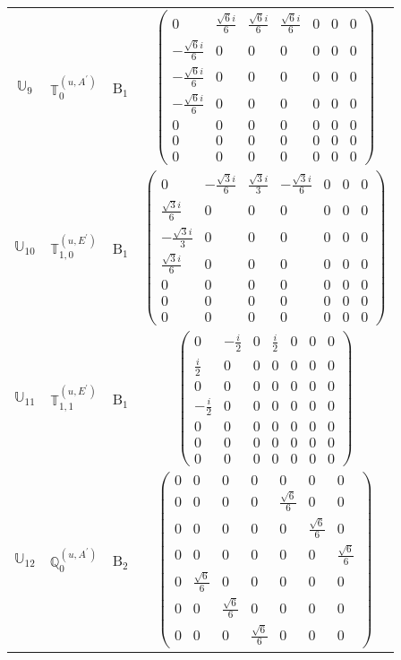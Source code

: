 \documentclass[fleqn,10pt,landscape]{article}
\begin{document}
\begin{itemize}
\begin{center}
\begin{longtable}{c|c|c|c}
$ \mathbb{U}_{9} $ & $\mathbb{T}_{0}^{(u,A^{\prime})}$ & B$_{1}$ & $\begin{pmatrix} 0 & \frac{\sqrt{6} i}{6} & \frac{\sqrt{6} i}{6} & \frac{\sqrt{6} i}{6} & 0 & 0 & 0 \\ - \frac{\sqrt{6} i}{6} & 0 & 0 & 0 & 0 & 0 & 0 \\ - \frac{\sqrt{6} i}{6} & 0 & 0 & 0 & 0 & 0 & 0 \\ - \frac{\sqrt{6} i}{6} & 0 & 0 & 0 & 0 & 0 & 0 \\ 0 & 0 & 0 & 0 & 0 & 0 & 0 \\ 0 & 0 & 0 & 0 & 0 & 0 & 0 \\ 0 & 0 & 0 & 0 & 0 & 0 & 0 \end{pmatrix}$ \\
$ \mathbb{U}_{10} $ & $\mathbb{T}_{1,0}^{(u,E^{\prime})}$ & B$_{1}$ & $\begin{pmatrix} 0 & - \frac{\sqrt{3} i}{6} & \frac{\sqrt{3} i}{3} & - \frac{\sqrt{3} i}{6} & 0 & 0 & 0 \\ \frac{\sqrt{3} i}{6} & 0 & 0 & 0 & 0 & 0 & 0 \\ - \frac{\sqrt{3} i}{3} & 0 & 0 & 0 & 0 & 0 & 0 \\ \frac{\sqrt{3} i}{6} & 0 & 0 & 0 & 0 & 0 & 0 \\ 0 & 0 & 0 & 0 & 0 & 0 & 0 \\ 0 & 0 & 0 & 0 & 0 & 0 & 0 \\ 0 & 0 & 0 & 0 & 0 & 0 & 0 \end{pmatrix}$ \\
$ \mathbb{U}_{11} $ & $\mathbb{T}_{1,1}^{(u,E^{\prime})}$ & B$_{1}$ & $\begin{pmatrix} 0 & - \frac{i}{2} & 0 & \frac{i}{2} & 0 & 0 & 0 \\ \frac{i}{2} & 0 & 0 & 0 & 0 & 0 & 0 \\ 0 & 0 & 0 & 0 & 0 & 0 & 0 \\ - \frac{i}{2} & 0 & 0 & 0 & 0 & 0 & 0 \\ 0 & 0 & 0 & 0 & 0 & 0 & 0 \\ 0 & 0 & 0 & 0 & 0 & 0 & 0 \\ 0 & 0 & 0 & 0 & 0 & 0 & 0 \end{pmatrix}$ \\ \hline
$ \mathbb{U}_{12} $ & $\mathbb{Q}_{0}^{(u,A^{\prime})}$ & B$_{2}$ & $\begin{pmatrix} 0 & 0 & 0 & 0 & 0 & 0 & 0 \\ 0 & 0 & 0 & 0 & \frac{\sqrt{6}}{6} & 0 & 0 \\ 0 & 0 & 0 & 0 & 0 & \frac{\sqrt{6}}{6} & 0 \\ 0 & 0 & 0 & 0 & 0 & 0 & \frac{\sqrt{6}}{6} \\ 0 & \frac{\sqrt{6}}{6} & 0 & 0 & 0 & 0 & 0 \\ 0 & 0 & \frac{\sqrt{6}}{6} & 0 & 0 & 0 & 0 \\ 0 & 0 & 0 & \frac{\sqrt{6}}{6} & 0 & 0 & 0 \end{pmatrix}$ \\

\end{longtable}
\end{center}
\end{itemize}
\end{document}
